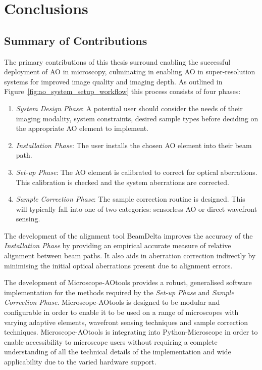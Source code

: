\chapter{Conclusions}
\label{chpt:conclusions}

\section{Summary of Contributions}
\label{sec:contributions}

The primary contributions of this thesis surround enabling the successful 
deployment of AO in microscopy, culminating in enabling AO in 
super-resolution systems for improved image quality and imaging depth. As 
outlined in Figure~\ref{fig:ao_system_setup_workflow} this process consists 
of four phases:

\begin{enumerate}
	\item \textit{System Design Phase}: A potential user should consider 
	the needs of their imaging modality, system constraints, desired 
	sample types before deciding on the appropriate AO element to 
	implement.
	\item \textit{Installation Phase}: The user installs the chosen AO 
	element into their beam path.
	\item \textit{Set-up Phase}: The AO element is calibrated to correct 
	for optical aberrations. This calibration is checked and the system 
	aberrations are corrected.
	\item \textit{Sample Correction Phase}: The sample correction routine 
	is designed. This will typically fall into one of two categories: 
	sensorless AO or direct wavefront sensing.
\end{enumerate}  

The development of the alignment tool BeamDelta improves the accuracy of the 
\textit{Installation Phase} by providing an empirical accurate measure of 
relative alignment between beam paths\cite{dobbie2019beamdelta}. It also aids 
in aberration correction indirectly by minimising the initial optical 
aberrations present due to alignment errors.

The development of Microscope-AOtools provides a robust, generalised 
software implementation for the methods required by the \textit{Set-up Phase} 
and \textit{Sample Correction Phase}\cite{hall2020microscope}. 
Microscope-AOtools is designed to be modular and configurable in order to 
enable it to be used on a range of microscopes with varying adaptive 
elements, wavefront sensing techniques and sample correction techniques. 
Microscope-AOtools is integrating into Python-Microscope in order to enable 
accessibility to microscope users without requiring a complete understanding 
of all the technical details of the implementation and wide
applicability due to the varied hardware support.

